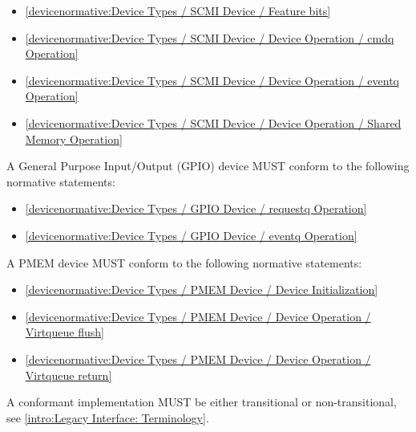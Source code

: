 \begin{itemize}
\item \ref{devicenormative:Device Types / SCMI Device / Feature bits}
\item \ref{devicenormative:Device Types / SCMI Device / Device Operation / cmdq Operation}
\item \ref{devicenormative:Device Types / SCMI Device / Device Operation / eventq Operation}
\item \ref{devicenormative:Device Types / SCMI Device / Device Operation / Shared Memory Operation}
\end{itemize}

\label{sec:Conformance / Device Conformance / GPIO Device Conformance}

A General Purpose Input/Output (GPIO) device MUST conform to the following
normative statements:

\begin{itemize}
\item \ref{devicenormative:Device Types / GPIO Device / requestq Operation}
\item \ref{devicenormative:Device Types / GPIO Device / eventq Operation}
\end{itemize}

\label{sec:Conformance / Device Conformance / PMEM Device Conformance}

A PMEM device MUST conform to the following normative statements:

\begin{itemize}
\item \ref{devicenormative:Device Types / PMEM Device / Device Initialization}
\item \ref{devicenormative:Device Types / PMEM Device / Device Operation / Virtqueue flush}
\item \ref{devicenormative:Device Types / PMEM Device / Device Operation / Virtqueue return}
\end{itemize}

\label{sec:Conformance / Legacy Interface: Transitional Device and Transitional Driver Conformance}
A conformant implementation MUST be either transitional or
non-transitional, see \ref{intro:Legacy
Interface: Terminology}.

